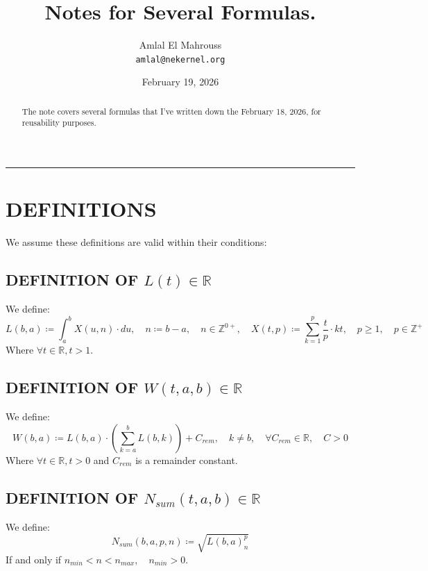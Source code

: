 \documentclass[11pt, a4paper]{article}
\title{Notes for Several Formulas.}
\author{Amlal El Mahrouss\\\texttt{amlal@nekernel.org}}
\date{February 19, 2026}
\begin{document}
\maketitle

\begin{center}
	\rule[0.01cm]{17cm}{0.01cm}
\end{center}

\begin{abstract}
\begin{center}
    The note covers several formulas that I've written down the February 18, 2026, for reusability purposes.
\end{center}
\end{abstract}

\section{DEFINITIONS}

We assume these definitions are valid within their conditions:

\subsection{DEFINITION OF $L(t) \in \mathbb{R}$}
We define:
\begin{equation}
	L(b, a) \coloneqq \int_{a}^{b}X(u, n)\cdot du, \quad n \coloneqq b - a, \quad n \in \mathbb{Z}^{0+}, \quad X(t, p) \coloneqq \sum_{k=1}^{p}\frac{t}{p}\cdot kt, \quad p \geq 1, \quad p \in \mathbb{Z}^{+}
\end{equation}
Where $\forall t \in \mathbb{R}, t > 1$.

\subsection{DEFINITION OF $W(t, a, b) \in \mathbb{R}$}
We define:
\begin{equation}
    W(b, a) \coloneqq L(b, a)\cdot(\sum_{k=a}^{b} L(b, k)) +C_{rem}, \quad k \neq b,\quad \forall C_{rem} \in \mathbb{R}, \quad C > 0
\end{equation}
Where $\forall t \in \mathbb{R}, t > 0$ and $C_{rem}$ is a remainder constant.

\subsection{DEFINITION OF $N_{sum}(t, a, b) \in \mathbb{R}$}

We define:
\begin{equation}
    N_{sum}(b, a, p, n) \coloneqq \sqrt{L(b, a)^p_{n}}
\end{equation}
If and only if $n_{min} < n < n_{max}, \quad n_{min} > 0$.
\end{document}
